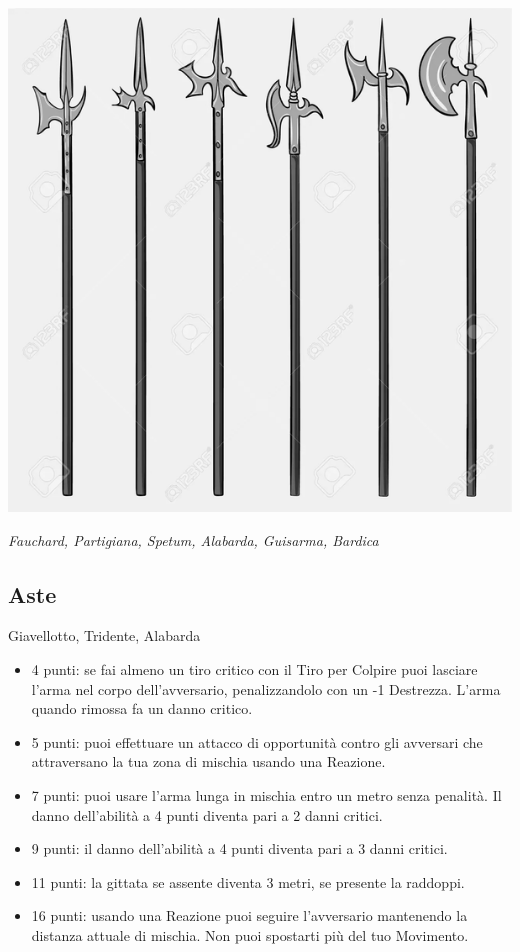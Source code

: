 \begin{multicols}{2}


\begin{center}
	\includegraphics[width=0.7\linewidth]{immagini/alabarda2.png}

	\emph{Fauchard, Partigiana, Spetum, Alabarda, Guisarma, Bardica}
\end{center}

\subsection{Aste} Giavellotto, Tridente, Alabarda\label{listaarmiaste}

\begin{itemize}[leftmargin=*] \setlength{\itemsep}{0pt}

\item 4 punti: se fai almeno un tiro critico con il Tiro per Colpire puoi lasciare l'arma nel corpo dell'avversario, penalizzandolo con un -1 Destrezza. L'arma quando rimossa fa un danno critico.
\item 5 punti: puoi effettuare un attacco di opportunità contro gli avversari che attraversano la tua zona di mischia usando una Reazione.
\item 7 punti: puoi usare l'arma lunga in mischia entro un metro senza penalità. Il danno dell'abilità a 4 punti diventa pari a 2 danni critici.
\item 9 punti: il danno dell'abilità a 4 punti diventa pari a 3 danni critici.
\item 11 punti: la gittata se assente diventa 3 metri, se presente la raddoppi.
\item 16 punti: usando una Reazione puoi seguire l'avversario mantenendo la distanza attuale di mischia. Non puoi spostarti più del tuo Movimento.


\end{itemize}
\end{multicols}

